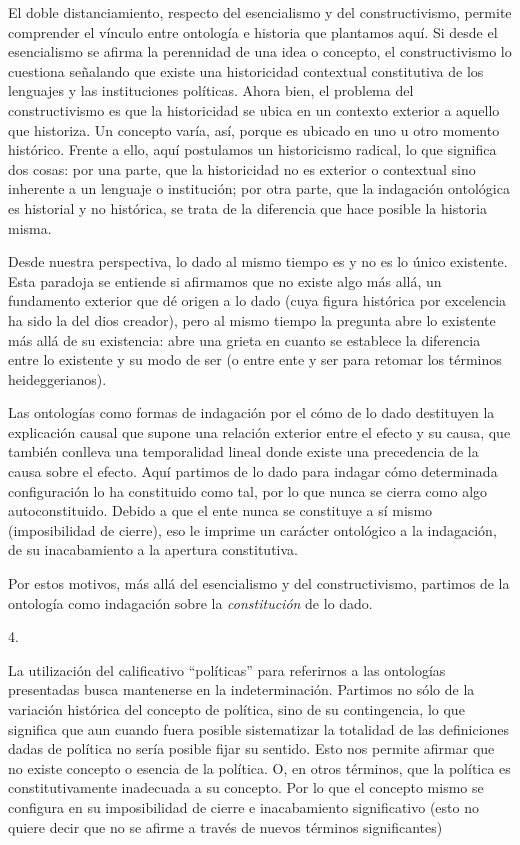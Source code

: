 El doble distanciamiento, respecto del esencialismo y del constructivismo, permite comprender el vínculo entre ontología e historia que plantamos aquí. Si desde el esencialismo se afirma la perennidad de una idea o concepto, el constructivismo lo cuestiona señalando que existe una historicidad contextual constitutiva de los lenguajes y las instituciones políticas. Ahora bien, el problema del constructivismo es que la historicidad se ubica en un contexto exterior a aquello que historiza. Un concepto varía, así, porque es ubicado en uno u otro momento histórico. Frente a ello, aquí postulamos un historicismo radical, lo que significa dos cosas: por una parte, que la historicidad no es exterior o contextual sino inherente a un lenguaje o institución; por otra parte, que la indagación ontológica es historial y no histórica, se trata de la diferencia que hace posible la historia misma.

Desde nuestra perspectiva, lo dado al mismo tiempo es y no es lo único existente. Esta paradoja se entiende si afirmamos que no existe algo más allá, un fundamento exterior que dé origen a lo dado (cuya figura histórica por excelencia ha sido la del dios creador), pero al mismo tiempo la pregunta abre lo existente más allá de su existencia: abre una grieta en cuanto se establece la diferencia entre lo existente y su modo de ser (o entre ente y ser para retomar los términos heideggerianos).

Las ontologías como formas de indagación por el cómo de lo dado destituyen la explicación causal que supone una relación exterior entre el efecto y su causa, que también conlleva una temporalidad lineal donde existe una precedencia de la causa sobre el efecto. Aquí partimos de lo dado para indagar cómo determinada configuración lo ha constituido como tal, por lo que nunca se cierra como algo autoconstituido. Debido a que el ente nunca se constituye a sí mismo (imposibilidad de cierre), eso le imprime un carácter ontológico a la indagación, de su inacabamiento a la apertura constitutiva.

Por estos motivos, más allá del esencialismo y del constructivismo, partimos de la ontología como indagación sobre la \emph{constitución} de lo dado.

4.

La utilización del calificativo \enquote{políticas} para referirnos a las ontologías presentadas busca mantenerse en la indeterminación. Partimos no sólo de la variación histórica del concepto de política, sino de su contingencia, lo que significa que aun cuando fuera posible sistematizar la totalidad de las definiciones dadas de política no sería posible fijar su sentido. Esto nos permite afirmar que no existe concepto o esencia de la política. O, en otros términos, que la política es constitutivamente inadecuada a su concepto. Por lo que el concepto mismo se configura en su imposibilidad de cierre e inacabamiento significativo (esto no quiere decir que no se afirme a través de nuevos términos significantes)

